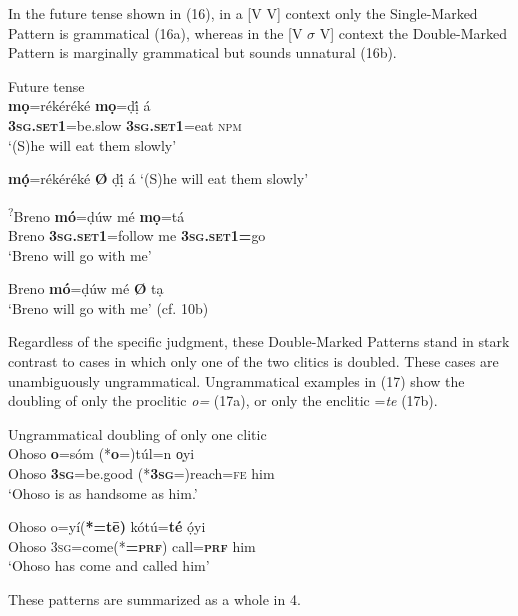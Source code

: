 \documentclass[output=paper]{langsci/langscibook}
\begin{document}
In the future tense shown in (16), in a [V V] context only the Single-Marked Pattern is grammatical (16a), whereas in the [V $\sigma $ V] context the Double-Marked Pattern is marginally grammatical but sounds unnatural (16b). 

\ea
{Future tense}\\
\gll   *\textbf{mọ}=rékéréké    \textbf{mọ}=ḍị́       á    \\
     \textbf{\textsc{3sg.set1}}=be.slow  \textbf{\textsc{3sg}}\textbf{.}\textbf{\textsc{set1}}=eat  \textsc{npm}\\
\glt ‘(S)he will eat them slowly’
\z

\ea
 \textbf{mọ́}=rékéréké \textbf{Ø} ḍị́ á 
\glt ‘(S)he will eat them slowly’
\z

\ea
\gll   \textsuperscript{?}Breno  \textbf{mó}=ḍúw    mé   \textbf{mọ}=tá    \\
     Breno     \textbf{\textsc{3sg.set1}}=follow  me  \textbf{\textsc{3sg.set1=}}go\\
\glt ‘Breno will go with me’
\z

\ea
   Breno \textbf{mó}=ḍúw mé \textbf{Ø} tạ\\
\glt ‘Breno will go with me’ (cf. 10b)
\z

Regardless of the specific judgment, these Double-Marked Patterns stand in stark contrast to cases in which only one of the two clitics is doubled. These cases are unambiguously ungrammatical. Ungrammatical examples in (17) show the doubling of only the proclitic \textit{o=} (17a), or only the enclitic =\textit{te }(17b). 

\ea
{Ungrammatical doubling of only one clitic}\\
\gll   Ohoso   \textbf{o}=sóm       (*\textbf{o}=)túl=n       o̩yi\\
       Ohoso  \textbf{\textsc{3sg}}=be.good   (*\textbf{\textsc{3sg}}=)reach=\textsc{fe  }   him\\
\glt ‘Ohoso is as handsome as him.’
\z

\ea
\gll   Ohoso  o=yí(\textbf{*=t\={e})}      kótú=\textbf{té}    ọ́yi\\
       Ohoso  \textsc{3sg}=come(*\textbf{=}\textbf{\textsc{prf}})  call=\textbf{\textsc{prf  }}  him\\
\glt ‘Ohoso has come and called him’ \citep[285]{Kari2003a}
\z

These patterns are summarized as a whole in 4.
\end{document}
